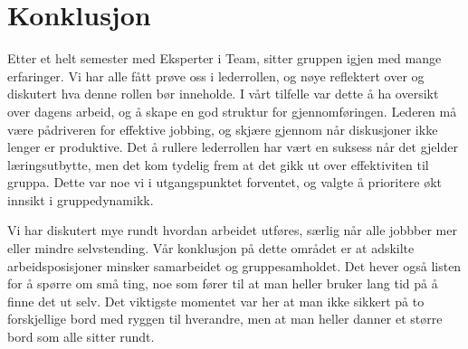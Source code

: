 \chapter{Konklusjon}

Etter et helt semester med Eksperter i Team, sitter gruppen igjen med mange erfaringer. 
Vi har alle fått prøve oss i lederrollen, og nøye reflektert over og diskutert hva denne rollen bør inneholde. 
I vårt tilfelle var dette å ha oversikt over dagens arbeid, og å skape en god struktur for gjennomføringen. 
Lederen må være pådriveren for effektive jobbing, og skjære gjennom når diskusjoner ikke lenger er produktive. 
Det å rullere lederrollen har vært en suksess når det gjelder læringsutbytte, men det kom tydelig frem at det gikk ut over effektiviten til gruppa. 
Dette var noe vi i utgangspunktet forventet, og valgte å prioritere økt innsikt i gruppedynamikk.

Vi har diskutert mye rundt hvordan arbeidet utføres, særlig når alle jobbber mer eller mindre selvstending. 
Vår konklusjon på dette området er at adskilte arbeidsposisjoner minsker samarbeidet og gruppesamholdet.
Det hever også listen for å spørre om små ting, noe som fører til at man heller bruker lang tid på å finne det ut selv. 
Det viktigste momentet var her at man ikke sikkert på to forskjellige bord med ryggen til hverandre, men at man heller danner et større bord som alle sitter rundt.


